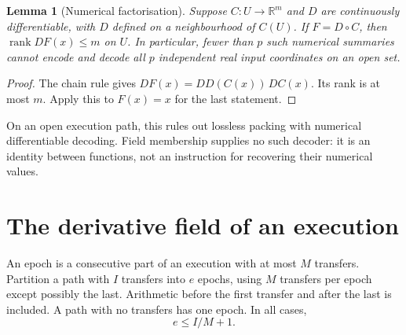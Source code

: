 \documentclass[11pt]{article}
\newtheorem{lemma}[lemma]{Lemma}
\theoremstyle{definition}
\theoremstyle{remark}
\newcommand{\R}{\mathbb R}
\newcommand{\rank}{\operatorname{rank}}
\begin{document}
\begin{lemma}[Numerical factorisation]
\label{lem:factor-rank}
Suppose $C:U\to\R^m$ and $D$ are continuously differentiable, with $D$
defined on a neighbourhood of $C(U)$. If $F=D\circ C$, then
$\rank DF(x)\le m$ on $U$. In particular, fewer than $p$ such numerical
summaries cannot encode and decode all $p$ independent real input
coordinates on an open set.
\end{lemma}
\begin{proof}
The chain rule gives $DF(x)=DD(C(x))\,DC(x)$. Its rank is at most $m$.
Apply this to $F(x)=x$ for the last statement.
\end{proof}

On an open execution path, this rules out lossless packing with
numerical differentiable decoding. Field membership supplies no such
decoder: it is an identity between functions, not an instruction for
recovering their numerical values.

\section{The derivative field of an execution}
\label{sec:history}
An epoch is a consecutive part of an execution with at most $M$
transfers. Partition a path with $I$ transfers into $e$ epochs, using
$M$ transfers per epoch except possibly the last. Arithmetic before the
first transfer and after the last is included. A path with no transfers
has one epoch. In all cases,
\begin{equation}
 e\le I/M+1.
 \label{eq:epochs}
\end{equation}
\end{document}
